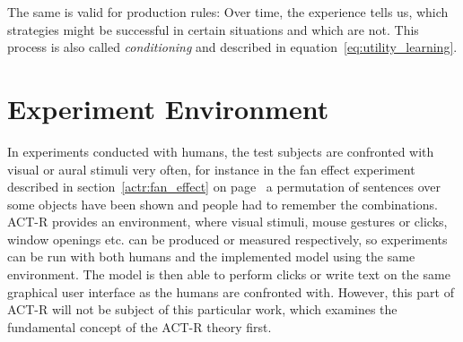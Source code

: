The same is valid for production rules: Over time, the experience tells us, which strategies might be successful in certain situations and which are not. This process is also called \emph{conditioning} and described in equation~\eqref{eq:utility_learning}.

\section{Experiment Environment}
\label{experiment_environment}

In experiments conducted with humans, the test subjects are confronted with visual or aural stimuli very often, for instance in the fan effect experiment described in section~\ref{actr:fan_effect} on page~\pageref{actr:fan_effect} a permutation of sentences over some objects have been shown and people had to remember the combinations. ACT-R provides an environment, where visual stimuli, mouse gestures or clicks, window openings etc. can be produced or measured respectively, so experiments can be run with both humans and the implemented model using the same environment. The model is then able to perform clicks or write text on the same graphical user interface as the humans are confronted with. However, this part of ACT-R will not be subject of this particular work, which examines the fundamental concept of the ACT-R theory first.
